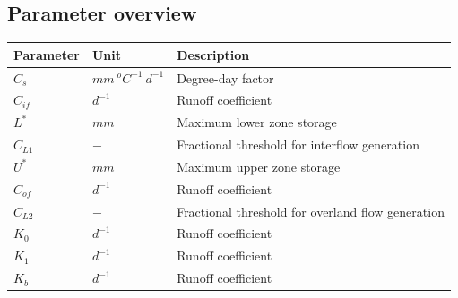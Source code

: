 \subsection{Parameter overview}
\begin{table}[htbp]
  \centering
    \begin{tabular}{lll}
    \toprule
    Parameter & Unit  & Description \\
    \midrule
    $C_s$ & $mm~^oC^{-1}~d^{-1}$ & Degree-day factor \\
    $C_{if}$ & $d^{-1}$ & Runoff coefficient \\
    $L^*$ & $mm$  & Maximum lower zone storage \\
    $C_{L1}$ & $-$   & Fractional threshold for interflow generation \\
    $U^*$ & $mm$  & Maximum upper zone storage \\
    $C_{of}$ & $d^{-1}$ & Runoff coefficient \\
    $C_{L2}$ & $-$   & Fractional threshold for overland flow generation \\
    $K_0$ & $d^{-1}$ & Runoff coefficient \\
    $K_1$ & $d^{-1}$ & Runoff coefficient \\
    $K_b$ & $d^{-1}$ & Runoff coefficient \\
    \bottomrule
    \end{tabular}%
  \label{tab:addlabel}%
\end{table}%

